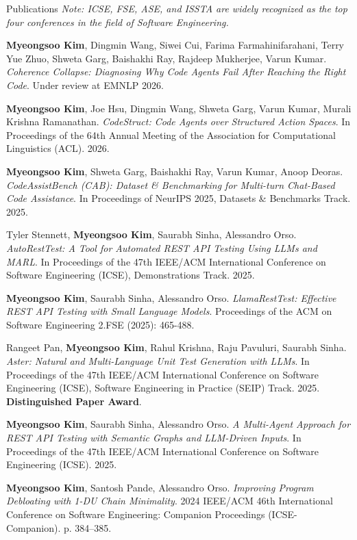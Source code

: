 \documentclass{resume} %
\begin{document}
\begin{rSection}{Publications}
\vspace{0.5em}
\textit{Note: ICSE, FSE, ASE, and ISSTA are widely recognized as the top four conferences in the field of Software Engineering.}

\textbf{Myeongsoo Kim}, Dingmin Wang, Siwei Cui, Farima Farmahinifarahani, Terry Yue Zhuo, Shweta Garg, Baishakhi Ray, Rajdeep Mukherjee, Varun Kumar. \textit{Coherence Collapse: Diagnosing Why Code Agents Fail After Reaching the Right Code}. Under review at EMNLP 2026.

\textbf{Myeongsoo Kim}, Joe Hsu, Dingmin Wang, Shweta Garg, Varun Kumar, Murali Krishna Ramanathan. \textit{CodeStruct: Code Agents over Structured Action Spaces}. In Proceedings of the 64th Annual Meeting of the Association for Computational Linguistics (ACL). 2026.

\textbf{Myeongsoo Kim}, Shweta Garg, Baishakhi Ray, Varun Kumar, Anoop Deoras. \textit{CodeAssistBench (CAB): Dataset \& Benchmarking for Multi-turn Chat-Based Code Assistance}. In Proceedings of NeurIPS 2025, Datasets \& Benchmarks Track. 2025.

Tyler Stennett, \textbf{Myeongsoo Kim}, Saurabh Sinha, Alessandro Orso. \textit{AutoRestTest: A Tool for Automated REST API Testing Using LLMs and MARL}. In Proceedings of the 47th IEEE/ACM International Conference on Software Engineering (ICSE), Demonstrations Track. 2025.

\textbf{Myeongsoo Kim}, Saurabh Sinha, Alessandro Orso. \textit{LlamaRestTest: Effective REST API Testing with Small Language Models}. Proceedings of the ACM on Software Engineering 2.FSE (2025): 465-488.

Rangeet Pan, \textbf{Myeongsoo Kim}, Rahul Krishna, Raju Pavuluri, Saurabh Sinha. \textit{Aster: Natural and Multi-Language Unit Test Generation with LLMs}. In Proceedings of the 47th IEEE/ACM International Conference on Software Engineering (ICSE), Software Engineering in Practice (SEIP) Track. 2025. \textbf{Distinguished Paper Award}.

\textbf{Myeongsoo Kim}, Saurabh Sinha, Alessandro Orso. \textit{A Multi-Agent Approach for REST API Testing with Semantic Graphs and LLM-Driven Inputs}. In Proceedings of the 47th IEEE/ACM International Conference on Software Engineering (ICSE). 2025.

\textbf{Myeongsoo Kim}, Santosh Pande, Alessandro Orso. \textit{Improving Program Debloating with 1-DU Chain Minimality}. 2024 IEEE/ACM 46th International Conference on Software Engineering: Companion Proceedings (ICSE-Companion). p. 384–385.


\end{rSection}
\end{document}
